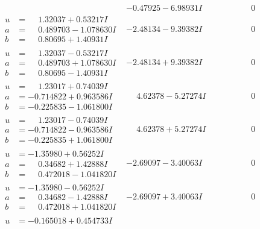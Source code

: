\documentclass[1p]{elsarticle_modified}
\theoremstyle{definition}
\begin{document}
$$\begin{array}{c|c|c}
 & -0.47925 - 6.98931 I & \phantom{-0.000000 } 0 \\ \hline\begin{aligned}
u &= \phantom{-}1.32037 + 0.53217 I \\
a &= \phantom{-}0.489703 - 1.078630 I \\
b &= \phantom{-}0.80695 + 1.40931 I\end{aligned}
 & -2.48134 - 9.39382 I & \phantom{-0.000000 } 0 \\ \hline\begin{aligned}
u &= \phantom{-}1.32037 - 0.53217 I \\
a &= \phantom{-}0.489703 + 1.078630 I \\
b &= \phantom{-}0.80695 - 1.40931 I\end{aligned}
 & -2.48134 + 9.39382 I & \phantom{-0.000000 } 0 \\ \hline\begin{aligned}
u &= \phantom{-}1.23017 + 0.74039 I \\
a &= -0.714822 + 0.963586 I \\
b &= -0.225835 - 1.061800 I\end{aligned}
 & \phantom{-}4.62378 - 5.27274 I & \phantom{-0.000000 } 0 \\ \hline\begin{aligned}
u &= \phantom{-}1.23017 - 0.74039 I \\
a &= -0.714822 - 0.963586 I \\
b &= -0.225835 + 1.061800 I\end{aligned}
 & \phantom{-}4.62378 + 5.27274 I & \phantom{-0.000000 } 0 \\ \hline\begin{aligned}
u &= -1.35980 + 0.56252 I \\
a &= \phantom{-}0.34682 + 1.42888 I \\
b &= \phantom{-}0.472018 - 1.041820 I\end{aligned}
 & -2.69097 - 3.40063 I & \phantom{-0.000000 } 0 \\ \hline\begin{aligned}
u &= -1.35980 - 0.56252 I \\
a &= \phantom{-}0.34682 - 1.42888 I \\
b &= \phantom{-}0.472018 + 1.041820 I\end{aligned}
 & -2.69097 + 3.40063 I & \phantom{-0.000000 } 0 \\ \hline\begin{aligned}
u &= -0.165018 + 0.454733 I \\

\end{aligned}
\end{array}$$
\end{document}
